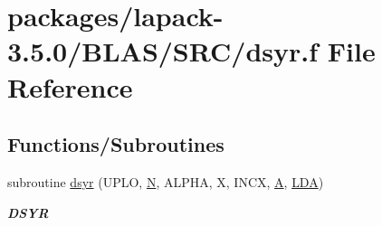 \hypertarget{lapack-3_85_80_2BLAS_2SRC_2dsyr_8f}{}\section{packages/lapack-\/3.5.0/\+B\+L\+A\+S/\+S\+R\+C/dsyr.f File Reference}
\label{lapack-3_85_80_2BLAS_2SRC_2dsyr_8f}
\subsection*{Functions/\+Subroutines}
\begin{DoxyCompactItemize}
\item 
subroutine \hyperlink{group__double__blas__level2_ga35ca25bb135cd7bfdd5d6190b1aa4d07}{dsyr} (U\+P\+L\+O, \hyperlink{polmisc_8c_a0240ac851181b84ac374872dc5434ee4}{N}, A\+L\+P\+H\+A, X, I\+N\+C\+X, \hyperlink{classA}{A}, \hyperlink{example__user_8c_ae946da542ce0db94dced19b2ecefd1aa}{L\+D\+A})
\begin{DoxyCompactList}\small\item\em {\bfseries D\+S\+Y\+R} \end{DoxyCompactList}\end{DoxyCompactItemize}
